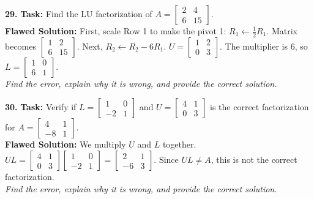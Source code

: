 \documentclass[11pt]{article}
\begin{document}
\textbf{29.} \textbf{Task:} Find the LU factorization of $A = \begin{bmatrix} 2 & 4 \\ 6 & 15 \end{bmatrix}$. \\
\textbf{Flawed Solution:} First, scale Row 1 to make the pivot 1: $R_1 \leftarrow \frac{1}{2}R_1$. Matrix becomes $\begin{bmatrix} 1 & 2 \\ 6 & 15 \end{bmatrix}$. Next, $R_2 \leftarrow R_2 - 6R_1$. $U = \begin{bmatrix} 1 & 2 \\ 0 & 3 \end{bmatrix}$. The multiplier is $6$, so $L = \begin{bmatrix} 1 & 0 \\ 6 & 1 \end{bmatrix}$. \\
\textit{Find the error, explain why it is wrong, and provide the correct solution.}

\textbf{30.} \textbf{Task:} Verify if $L = \begin{bmatrix} 1 & 0 \\ -2 & 1 \end{bmatrix}$ and $U = \begin{bmatrix} 4 & 1 \\ 0 & 3 \end{bmatrix}$ is the correct factorization for $A = \begin{bmatrix} 4 & 1 \\ -8 & 1 \end{bmatrix}$. \\
\textbf{Flawed Solution:} We multiply $U$ and $L$ together. $UL = \begin{bmatrix} 4 & 1 \\ 0 & 3 \end{bmatrix} \begin{bmatrix} 1 & 0 \\ -2 & 1 \end{bmatrix} = \begin{bmatrix} 2 & 1 \\ -6 & 3 \end{bmatrix}$. Since $UL \neq A$, this is not the correct factorization. \\
\textit{Find the error, explain why it is wrong, and provide the correct solution.}

\newpage
\end{document}
